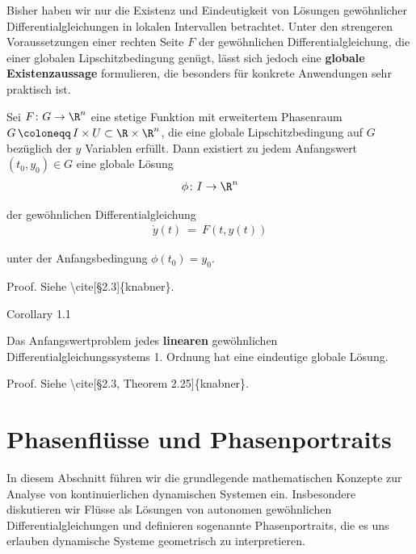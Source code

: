\documentclass[letterpaper,10pt,english]{jupyterBook}
\begin{document}
\par
Bisher haben wir nur die Existenz und Eindeutigkeit von Lösungen gewöhnlicher Differentialgleichungen in lokalen Intervallen betrachtet.
Unter den strengeren Voraussetzungen einer rechten Seite \(F\) der gewöhnlichen Differentialgleichung, die einer globalen Lipschitzbedingung genügt, lässt sich jedoch eine \textbf{globale Existenzaussage} formulieren, die besonders für konkrete Anwendungen sehr praktisch ist.
\label{ode/repetition:satz:picardlindeloef_lokal}
\begin{theorem}{}{}



\par
Sei \(F\colon G\to\R^n\) eine stetige Funktion mit erweitertem Phasenraum \(G \, \coloneqq \, I \times U \subset \R\times\R^n\), die eine globale Lipschitzbedingung auf \(G\) bezüglich der \(y\) Variablen erfüllt.
Dann existiert zu jedem Anfangswert \((t_0,y_0) \in G\) eine globale Lösung
\begin{align*}
\phi \colon I \to \R^n
\end{align*}
\par
der gewöhnlichen Differentialgleichung
\begin{align*}
\dot{y}(t) \ = \ F(t,y(t))
\end{align*}
\par
unter der Anfangsbedingung \(\phi(t_0)=y_0\).
\end{theorem}

\begin{emphBox}{}{}
\par
Proof. Siehe \textbackslash{}cite{[}§2.3{]}\{knabner\}.
\end{emphBox}
\label{ode/repetition:corollary-11}
\begin{emphBox}{}{}{Corollary 1.1}



\par
Das Anfangswertproblem jedes \textbf{linearen} gewöhnlichen Differentialgleichungssystems 1. Ordnung hat eine eindeutige globale Lösung.
\end{emphBox}

\begin{emphBox}{}{}
\par
Proof. Siehe \textbackslash{}cite{[}§2.3, Theorem 2.25{]}\{knabner\}.
\end{emphBox}


\section{Phasenflüsse und Phasenportraits}
\label{\detokenize{ode/fluesse:phasenflusse-und-phasenportraits}}\label{\detokenize{ode/fluesse:s-fluesse}}\label{\detokenize{ode/fluesse::doc}}
\par
In diesem Abschnitt führen wir die grundlegende mathematischen Konzepte zur Analyse von kontinuierlichen dynamischen Systemen ein. Insbesondere diskutieren wir Flüsse als Lösungen von autonomen gewöhnlichen Differentialgleichungen und definieren sogenannte Phasenportraits, die es uns erlauben dynamische Systeme geometrisch zu interpretieren.
\end{document}
